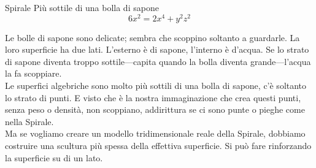 \begin{surferPage}{Spirale}
Pi\`u sottile di una bolla di sapone\\
  \smallskip
\[6x^2	= 2x^4	+ y^2	z^2\]

\singlespacing
Le bolle di sapone sono delicate; sembra che scoppino soltanto a guardarle. La loro superficie ha due lati. L'esterno \`e di sapone, l'interno \`e d'acqua. Se lo strato di sapone diventa troppo sottile---capita quando la bolla diventa grande---l'acqua la fa scoppiare.\\
\vspace{0,3cm}
Le superfici algebriche sono molto pi\`u sottili di una bolla di sapone, c'\`e soltanto lo strato di punti. E visto che \`e la nostra immaginazione che crea questi punti, senza peso o densit\`a, non scoppiano, addirittura se ci sono punte o pieghe come nella Spirale.\\
\vspace{0,3cm}
Ma se vogliamo creare un modello tridimensionale reale della Spirale, dobbiamo costruire una scultura pi\`u spessa della effettiva superficie. Si pu\`o fare rinforzando la superficie su di un lato.
\end{surferPage}
